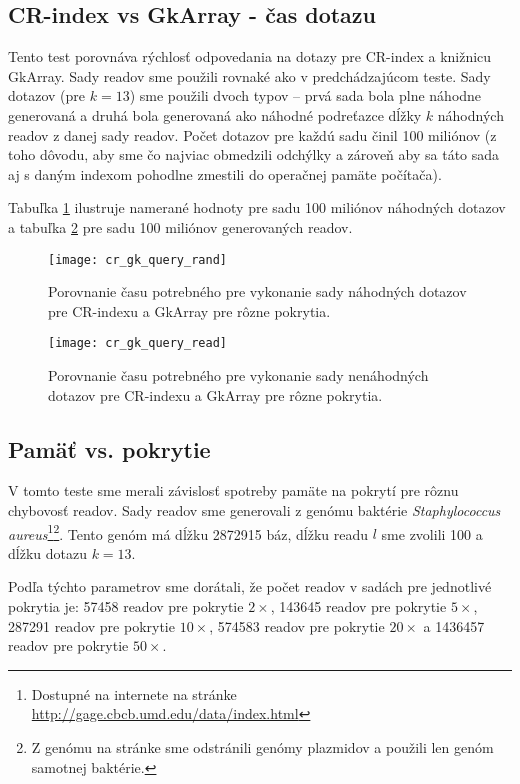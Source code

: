 \subsection{CR-index vs GkArray - čas dotazu}
Tento test porovnáva rýchlosť odpovedania na dotazy pre CR-index a knižnicu GkArray. Sady readov sme použili rovnaké ako v predchádzajúcom teste. Sady dotazov (pre $k=13$) sme použili dvoch typov -- prvá sada bola plne náhodne generovaná a druhá bola generovaná ako náhodné podreťazce dĺžky $k$ náhodných readov z danej sady readov. Počet dotazov pre každú sadu činil 100 miliónov (z toho dôvodu, aby sme čo najviac obmedzili odchýlky a zároveň aby sa táto sada aj s daným indexom pohodlne zmestili do operačnej pamäte počítača). 

Tabuľka \ref{fig:graf_cr_gk_query_rand} ilustruje namerané hodnoty pre sadu 100 miliónov náhodných dotazov a tabuľka \ref{fig:graf_cr_gk_query_read} pre sadu 100 miliónov generovaných readov.

\begin{figure}[h]
    \centering
    \texttt{[image: cr\_gk\_query\_rand]}
    \caption{Porovnanie času potrebného pre vykonanie sady náhodných dotazov pre CR-indexu a GkArray pre rôzne pokrytia.}
    \label{fig:graf_cr_gk_query_rand}
\end{figure}

\begin{figure}[h]
    \centering
    \texttt{[image: cr\_gk\_query\_read]}
    \caption{Porovnanie času potrebného pre vykonanie sady nenáhodných dotazov pre CR-indexu a GkArray pre rôzne pokrytia.}
    \label{fig:graf_cr_gk_query_read}
\end{figure}


\clearpage

\subsection{Pamäť vs. pokrytie}
V tomto teste sme merali závislosť spotreby pamäte na pokrytí pre rôznu chybovosť readov. Sady readov sme generovali z genómu baktérie \emph{Staphylococcus aureus}\footnote{Dostupné na internete na stránke \url{http://gage.cbcb.umd.edu/data/index.html}}\footnote{Z genómu na stránke sme odstránili genómy plazmidov a použili len genóm samotnej baktérie.}. Tento genóm má dĺžku 2872915 báz, dĺžku readu $l$ sme zvolili 100 a dĺžku dotazu $k=13$. 

Podľa týchto parametrov sme dorátali, že počet readov v sadách pre jednotlivé pokrytia je: 57458 readov pre pokrytie $2\times$, 143645 readov pre pokrytie $5\times$, 287291 readov pre pokrytie $10\times$, 574583 readov pre pokrytie $20\times$ a 1436457 readov pre pokrytie $50\times$.


